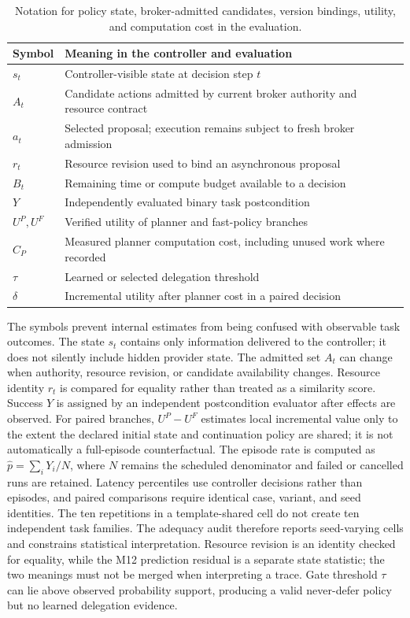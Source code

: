 \begin{table}[H]\centering\small
\begin{tabularx}{.90\linewidth}{lX}\toprule
Symbol & Meaning in the controller and evaluation\\\midrule
$s_t$ & Controller-visible state at decision step $t$\\
$A_t$ & Candidate actions admitted by current broker authority and resource contract\\
$a_t$ & Selected proposal; execution remains subject to fresh broker admission\\
$r_t$ & Resource revision used to bind an asynchronous proposal\\
$B_t$ & Remaining time or compute budget available to a decision\\
$Y$ & Independently evaluated binary task postcondition\\
$U^P,U^F$ & Verified utility of planner and fast-policy branches\\
$C_P$ & Measured planner computation cost, including unused work where recorded\\
$\tau$ & Learned or selected delegation threshold\\
$\delta$ & Incremental utility after planner cost in a paired decision\\
\bottomrule\end{tabularx}
\caption{Notation for policy state, broker-admitted candidates, version bindings, utility, and computation cost in the evaluation.}\label{tab:notation}\end{table}

The symbols prevent internal estimates from being confused with observable task outcomes. The state $s_t$ contains only information delivered to the controller; it does not silently include hidden provider state. The admitted set $A_t$ can change when authority, resource revision, or candidate availability changes. Resource identity $r_t$ is compared for equality rather than treated as a similarity score. Success $Y$ is assigned by an independent postcondition evaluator after effects are observed. For paired branches, $U^P-U^F$ estimates local incremental value only to the extent the declared initial state and continuation policy are shared; it is not automatically a full-episode counterfactual. The episode rate is computed as $\widehat p=\sum_iY_i/N$, where $N$ remains the scheduled denominator and failed or cancelled runs are retained. Latency percentiles use controller decisions rather than episodes, and paired comparisons require identical case, variant, and seed identities. The ten repetitions in a template-shared cell do not create ten independent task families. The adequacy audit therefore reports seed-varying cells and constrains statistical interpretation. Resource revision is an identity checked for equality, while the M12 prediction residual is a separate state statistic; the two meanings must not be merged when interpreting a trace. Gate threshold $\tau$ can lie above observed probability support, producing a valid never-defer policy but no learned delegation evidence.

